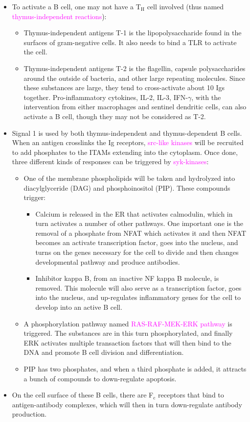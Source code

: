 \documentclass[UTF8]{book}
\newcommand{\pink}[1]{\textcolor{magenta}{#1}}
\begin{document}
\begin{itemize}
\item To activate a B cell, one may not have a T$_\mathrm{H}$ cell involved (thus named \pink{thymus-independent reactions}):
\begin{itemize}
	\item Thymus-independent antigens T-1 is the lipopolysaccharide found in the surfaces of gram-negative cells. It also needs to bind a TLR to activate the cell.
	\item Thymus-independent antigens T-2 is the flagellin, capsule polysaccharides around the outside of bacteria, and other large repeating molecules. Since these substances are large, they tend to cross-activate about 10 Igs together. Pro-inflammatory cytokines, IL-2, IL-3, IFN-$\gamma$, with the intervention from either macrophages and sentinel dendritic cells, can also activate a B cell, though they may not be considered as T-2.
\end{itemize}
\item Signal 1 is used by both thymus-independent and thymus-dependent B cells. When an antigen crosslinks the Ig receptors, \pink{src-like kinases} will be recruited to add phosphates to the ITAMs extending into the cytoplasm. Once done, three different kinds of responses can be triggered by \pink{syk-kinases}:
\begin{itemize}
	\item One of the membrane phospholipids will be taken and hydrolyzed into diacylglyceride (DAG) and phosphoinositol (PIP). These compounds trigger:
	\begin{itemize}
		\item Calcium is released in the ER that activates calmodulin, which in turn activates a number of other pathways. One important one is the removal of a phosphate from NFAT which activates it and then NFAT becomes an activate transcription factor, goes into the nucleus, and turns on the genes necessary for the cell to divide and then changes developmental pathway and produce antibodies.
		\item Inhibitor kappa B, from an inactive NF kappa B molecule, is removed. This molecule will also serve as a transcription factor, goes into the nucleus, and up-regulates inflammatory genes for the cell to develop into an active B cell.
	\end{itemize}
	\item A phosphorylation pathway named \pink{RAS-RAF-MEK-ERK pathway} is triggered. The substances are in this turn phosphorylated, and finally ERK activates multiple transaction factors that will then bind to the DNA and promote B cell division and differentiation.
	\item PIP has two phosphates, and when a third phosphate is added, it attracts a bunch of compounds to down-regulate apoptosis.
\end{itemize}
\item On the cell surface of these B cells, there are F$_\mathrm{c}$ receptors that bind to antigen-antibody complexes, which will then in turn down-regulate antibody production.
\end{itemize}
\end{document}
